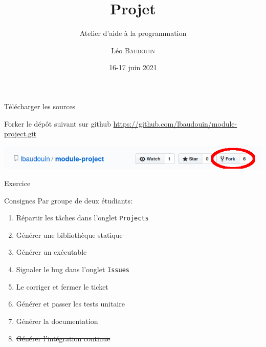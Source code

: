 \documentclass{beamer}
\title{Projet}
\subtitle{Atelier d'aide à la programmation}
\author{L\'eo \textsc{Baudouin}}
\institute{
  {\url{baudouin.leo @ gmail.com}}
}
\date{16-17 juin 2021}
\begin{document}
\begin{frame}
  \titlepage
\end{frame}


\section{}
\subsection{}

\begin{frame}[fragile]{Télécharger les sources}
  \begin{block}{Forker le dép\^ot suivant sur github}
    \url{https://github.com/lbaudouin/module-project.git}
  \end{block}
  
\includegraphics[width=\linewidth]{images/fork.png}  
  
\end{frame}

\begin{frame}[fragile]{Exercice}  
    \begin{exampleblock}{Consignes}
	Par groupe de deux étudiants:
    \begin{enumerate}
    \item Répartir les tâches dans l'onglet \verb?Projects?
    \item Générer une bibliothèque statique
    \item Générer un exécutable
    \item Signaler le bug dans l'onglet \verb?Issues?
    \item Le corriger et fermer le ticket
    \item Générer et passer les tests unitaire
    \item Générer la documentation
    \item \sout{Générer l'intégration continue}
    \end{enumerate}
  \end{exampleblock}
\end{frame}

\end{document}
